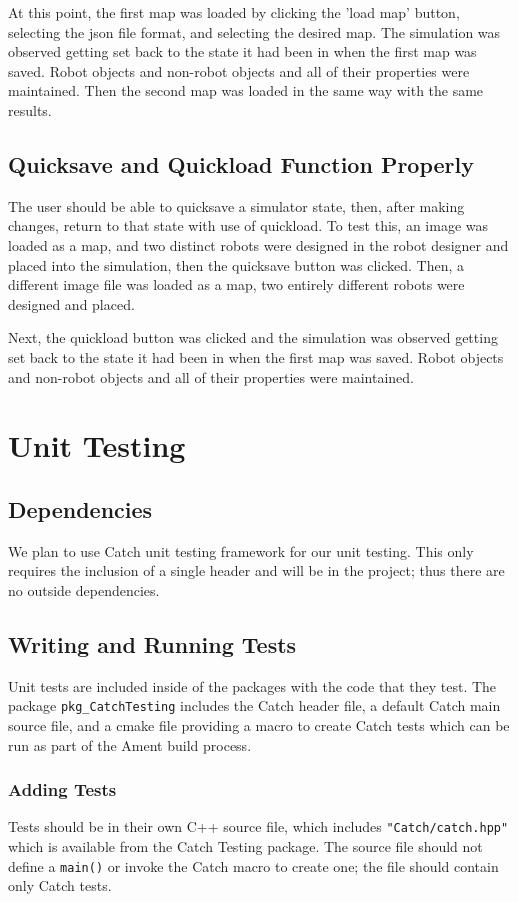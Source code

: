 At this point, the first map was loaded by clicking the 'load map' button, selecting the json file format, and selecting the desired map. The simulation was observed getting set back to the state it had been in when the first map was saved. Robot objects and non-robot objects and all of their properties were maintained. Then the second map was loaded in the same way with the same results.

\subsection{Quicksave and Quickload Function Properly}
The user should be able to quicksave a simulator state, then, after making changes, return to that state with use of quickload. To test this, an image was loaded as a map, and two distinct robots were designed in the robot designer and placed into the simulation, then the quicksave button was clicked. Then, a different image file was loaded as a map, two entirely different robots were designed and placed.

Next, the quickload button was clicked and the simulation was observed getting set back to the state it had been in when the first map was saved. Robot objects and non-robot objects and all of their properties were maintained.

\section{Unit Testing}

\subsection{Dependencies}
We plan to use Catch unit testing framework for our unit testing. This only requires the inclusion of a single header and will be in the project; thus there are no outside dependencies.

\subsection{Writing and Running Tests}
Unit tests are included inside of the packages with the code that they test. The package \lstinline|pkg_CatchTesting| includes the Catch header file, a default Catch main source file, and a cmake file providing a macro to create Catch tests which can be run as part of the Ament build process.

\subsubsection*{Adding Tests}
Tests should be in their own C++ source file, which includes \lstinline|"Catch/catch.hpp"| which is available from the Catch Testing package. The source file should not define a \lstinline|main()| or invoke the Catch macro to create one; the file should contain only Catch tests.

